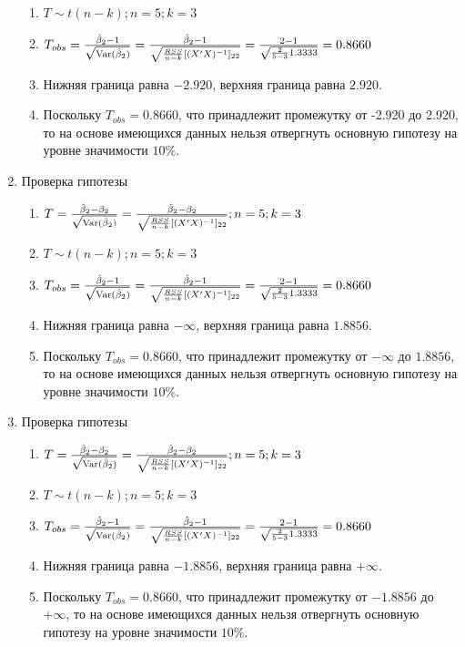 \begin{problem}
\begin{sol}
\begin{enumerate}
\begin{enumerate}
\item $T \sim t(n-k); n = 5; k = 3$
\item $T_{obs} = \frac{\hat{\beta}_2 - 1}{\sqrt{\operatorname{Var}(\hat{\beta}_2)}} = \frac {\hat{\beta}_2 - 1}{\sqrt{{\frac{RSS}{n-k}}[(X'X)^{-1}]_{22}}} = \frac{2-1}{\sqrt{{\frac{2}{5-3}}1.3333}} = 0.8660$
\item Нижняя граница равна $-2.920$, верхняя граница равна $2.920$.
\item Поскольку $T_{obs} = 0.8660$, что принадлежит промежутку от -2.920 до 2.920, 
то на основе имеющихся данных нельзя отвергнуть основную гипотезу на уровне значимости $10\%$.
\end{enumerate}
\item Проверка гипотезы
\begin{enumerate}
\item $T = \frac{\hat{\beta}_2 - \beta_2}{\sqrt{\operatorname{Var}(\hat{\beta}_2)}} = \frac {\hat{\beta}_2 - \beta_2}{\sqrt{{\frac{RSS}{n-k}}[(X'X)^{-1}]_{22}}}; n = 5; k = 3$
\item $T \sim t(n-k); n = 5; k = 3$
\item $T_{obs} = \frac{\hat{\beta}_2 - 1}{\sqrt{\operatorname{Var}(\hat{\beta}_2)}} = \frac {\hat{\beta}_2 - 1}{\sqrt{{\frac{RSS}{n-k}}[(X'X)^{-1}]_{22}}} = \frac{2-1}{\sqrt{{\frac{2}{5-3}}1.3333}} = 0.8660$
\item Нижняя граница равна $-\infty$, верхняя граница равна $1.8856$.
\item Поскольку $T_{obs} = 0.8660$, что принадлежит промежутку от $-\infty$ до $1.8856$, 
то на основе имеющихся данных нельзя отвергнуть основную гипотезу на уровне значимости $10\%$.
\end{enumerate}
\item Проверка гипотезы
\begin{enumerate}
\item $T = \frac{\hat{\beta}_2 - \beta_2}{\sqrt{\operatorname{Var}(\hat{\beta}_2)}} = \frac {\hat{\beta}_2 - \beta_2}{\sqrt{{\frac{RSS}{n-k}}[(X'X)^{-1}]_{22}}}; n = 5; k = 3$
\item $T \sim t(n-k); n = 5; k = 3$
\item $T_{obs} = \frac{\hat{\beta}_2 - 1}{\sqrt{\operatorname{Var}(\hat{\beta}_2)}} = \frac {\hat{\beta}_2 - 1}{\sqrt{{\frac{RSS}{n-k}}[(X'X)^{-1}]_{22}}} = \frac{2-1}{\sqrt{{\frac{2}{5-3}}1.3333}} = 0.8660$
\item Нижняя граница равна $-1.8856$, верхняя граница равна $+\infty$.
\item Поскольку $T_{obs} = 0.8660$, что принадлежит промежутку от $-1.8856$ до $+\infty$, 
то на основе имеющихся данных нельзя отвергнуть основную гипотезу на уровне значимости $10\%$.
\end{enumerate}

\end{enumerate}
\end{sol}
\end{problem}
